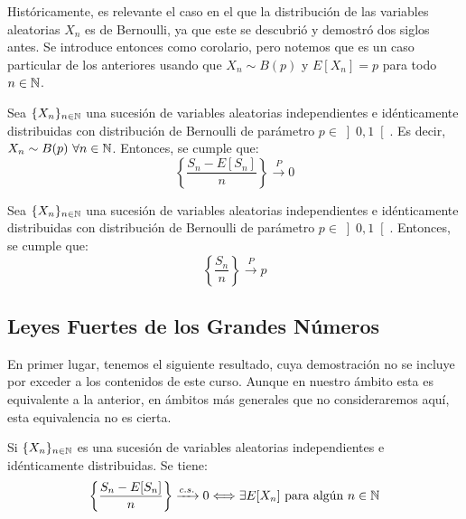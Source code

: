 Históricamente, es relevante el caso en el que la distribución de las variables aleatorias $X_n$ es de Bernoulli, ya que este se descubrió y demostró dos siglos antes. Se introduce entonces como corolario, pero notemos que es un caso particular de los anteriores usando que $X_n\sim B(p)$ y $E[X_n]=p$ para todo $n\in \mathbb{N}$.

\begin{coro}
    Sea $\{X_n\}_{n\in \mathbb{N}}$ una sucesión de variables aleatorias independientes e idénticamente distribuidas con distribución de Bernoulli de parámetro $p\in \left]0,1\right[$. Es decir, $X_n\sim B(p)~\forall n\in \mathbb{N}$. Entonces, se cumple que:
    \begin{equation*}
        \left\{\frac{S_n-E[S_n]}{n}\right\} \xrightarrow{P} 0
    \end{equation*}
\end{coro}
\begin{coro}
    Sea $\{X_n\}_{n\in \mathbb{N}}$ una sucesión de variables aleatorias independientes e idénticamente distribuidas con distribución de Bernoulli de parámetro $p\in \left]0,1\right[$. Entonces, se cumple que:
    \begin{equation*}
        \left\{\frac{S_n}{n}\right\} \xrightarrow{P} p
    \end{equation*}
\end{coro}


\subsection{Leyes Fuertes de los Grandes Números}

En primer lugar, tenemos el siguiente resultado, cuya demostración no se incluye por exceder a los contenidos de este curso. Aunque en nuestro ámbito esta es equivalente a la anterior, en ámbitos más generales que no consideraremos aquí, esta equivalencia no es cierta.
\begin{prop}
    Si $\{X_n\}_{n\in \mathbb{N}}$ es una sucesión de variables aleatorias independientes e idénticamente distribuidas. Se tiene:
    \begin{equation*}
        \left\{\frac{S_n-E[S_n]}{n}\right\} \xrightarrow{c.s.} 0
        \Longleftrightarrow \exists E[X_n] \text{ para algún } n\in \mathbb{N}
    \end{equation*}
\end{prop}

